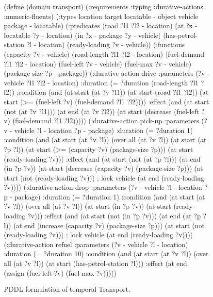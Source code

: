 \begin{figure}[p]
\begin{code}
(define (domain transport) 
  (:requirements :typing :durative-actions :numeric-fluents)
  (:types
        location target locatable - object
        vehicle package - locatable)
  (:predicates (road ?l1 ?l2 - location)
     (at ?x - locatable ?y - location) (in ?x - package ?y - vehicle)
     (has-petrol-station ?l - location) (ready-loading ?v - vehicle))
  (:functions (capacity ?v - vehicle) (road-length ?l1 ?l2 - location)
     (fuel-demand ?l1 ?l2 - location) (fuel-left ?v - vehicle)
     (fuel-max ?v - vehicle) (package-size ?p - package))
  (:durative-action drive
    :parameters (?v - vehicle ?l1 ?l2 - location)
    :duration (= ?duration (road-length ?l1 ?l2))
    :condition (and (at start (at ?v ?l1))
        (at start (road ?l1 ?l2))
        (at start (>= (fuel-left ?v) (fuel-demand ?l1 ?l2))))
    :effect (and (at start (not (at ?v ?l1)))
        (at end (at ?v ?l2))
        (at start (decrease (fuel-left ?v) (fuel-demand ?l1 ?l2)))))
  (:durative-action pick-up
    :parameters (?v - vehicle ?l - location ?p - package)
    :duration (= ?duration 1)
    :condition (and (at start (at ?v ?l))
        (over all (at ?v ?l))        (at start (at ?p ?l))
        (at start (>= (capacity ?v) (package-size ?p)))
        (at start (ready-loading ?v)))
    :effect (and (at start (not (at ?p ?l))) (at end (in ?p ?v))
        (at start (decrease (capacity ?v) (package-size ?p)))
        (at start (not (ready-loading ?v))) ; lock vehicle
        (at end (ready-loading ?v))))
  (:durative-action drop
    :parameters (?v - vehicle ?l - location ?p - package)
    :duration (= ?duration 1)
    :condition (and (at start (at ?v ?l))
        (over all (at ?v ?l))        (at start (in ?p ?v))
        (at start (ready-loading ?v)))
    :effect (and (at start (not (in ?p ?v)))
        (at end (at ?p ?l))
        (at end (increase (capacity ?v) (package-size ?p)))
        (at start (not (ready-loading ?v))) ; lock vehicle
        (at end (ready-loading ?v))))
  (:durative-action refuel
    :parameters (?v - vehicle ?l - location)
    :duration (= ?duration 10)
    :condition (and (at start (at ?v ?l))
        (over all (at ?v ?l)) (at start (has-petrol-station ?l)))
    :effect (at end (assign (fuel-left ?v) (fuel-max ?v)))))
\end{code}
\caption{PDDL formulation of temporal Transport.}
\label{code:pddl-temporal}
\end{figure} %









